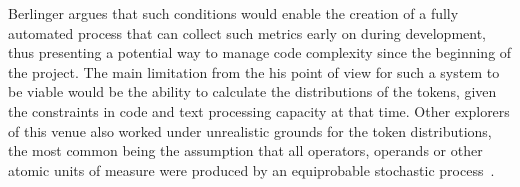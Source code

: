 \documentclass[10pt,conference]{IEEEtran}
\begin{document}
Berlinger argues that such conditions would enable the creation of a fully automated process that can collect such metrics early on during development, thus presenting a potential way to manage code complexity since the beginning of the project. The main limitation from the his point of view for such a system to be viable would be the ability to calculate the distributions of the tokens, given the constraints in code and text processing capacity at that time. Other explorers of this venue also worked under unrealistic grounds for the token distributions, the most common being the assumption that all operators, operands or other atomic units of measure were produced by an equiprobable stochastic process~\cite{halstead1977elements}. 
\end{document}

